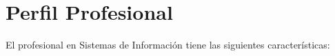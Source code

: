 \section{Perfil Profesional}\label{sec:professional-profile}
El profesional en Sistemas de Información tiene las siguientes caracterí­sticas:


\newenvironment{profile}{\begin{itemize}}{\end{itemize}}

